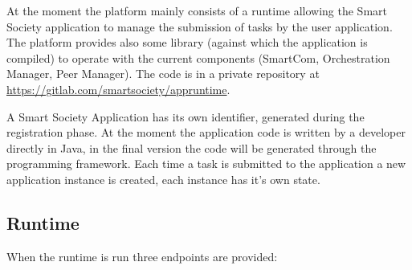 At the moment the platform mainly consists of a runtime allowing the Smart Society application to manage the submission of tasks by the user application. The platform provides also some library (against which the application is compiled) to operate with the current components (SmartCom, Orchestration Manager, Peer Manager). The code is in a private repository at \url{https://gitlab.com/smartsociety/appruntime}.%

A Smart Society Application has its own identifier, generated during the registration phase. At the moment the application code is written by a developer directly in Java, in the final version the code will be generated through the programming framework. Each time a task is submitted to the application a new application instance is created, each instance has it's own state.

\subsection{Runtime}

When the runtime is run three endpoints are provided: 

